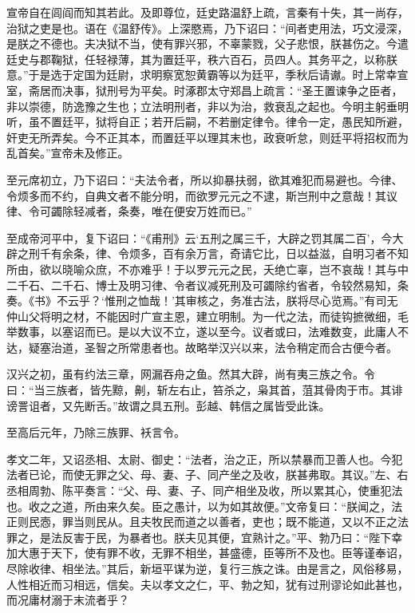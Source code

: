 \documentclass[12pt,UTF8]{ctexbook}
\begin{document}
宣帝自在闾阎而知其若此。及即尊位，廷史路温舒上疏，言秦有十失，其一尚存，治狱之吏是也。语在《温舒传》。上深愍焉，乃下诏曰：“间者吏用法，巧文浸深，是朕之不德也。夫决狱不当，使有罪兴邪，不辜蒙戮，父子悲恨，朕甚伤之。今遣廷史与郡鞠狱，任轻禄薄，其为置廷平，秩六百石，员四人。其务平之，以称朕意。”于是选于定国为廷尉，求明察宽恕黄霸等以为廷平，季秋后请谳。时上常幸宣室，斋居而决事，狱刑号为平矣。时涿郡太守郑昌上疏言：“圣王置谏争之臣者，非以崇德，防逸豫之生也；立法明刑者，非以为治，救衰乱之起也。今明主躬垂明听，虽不置廷平，狱将自正；若开后嗣，不若删定律令。律令一定，愚民知所避，奸吏无所弄矣。今不正其本，而置廷平以理其末也，政衰听怠，则廷平将招权而为乱首矣。”宣帝未及修正。



至元席初立，乃下诏曰：“夫法令者，所以抑暴扶弱，欲其难犯而易避也。今律、令烦多而不约，自典文者不能分明，而欲罗元元之不逮，斯岂刑中之意哉！其议律、令可蠲除轻减者，条奏，唯在便安万姓而已。”



至成帝河平中，复下诏曰：“《甫刑》云‘五刑之属三千，大辟之罚其属二百’，今大辟之刑千有余条，律、令烦多，百有余万言，奇请它比，日以益滋，自明习者不知所由，欲以晓喻众庶，不亦难乎！于以罗元元之民，夭绝亡辜，岂不哀哉！其与中二千石、二千石、博士及明习律、令者议减死刑及可蠲除约省者，令较然易知，条奏。《书》不云乎？‘惟刑之恤哉！’其审核之，务准古法，朕将尽心览焉。”有司无仲山父将明之材，不能因时广宣主恩，建立明制。为一代之法，而徒钩摭微细，毛举数事，以塞诏而已。是以大议不立，遂以至今。议者或曰，法难数变，此庸人不达，疑塞治道，圣智之所常患者也。故略举汉兴以来，法令稍定而合古便今者。



汉兴之初，虽有约法三章，网漏吞舟之鱼。然其大辟，尚有夷三族之令。令曰：“当三族者，皆先黥，劓，斩左右止，笞杀之，枭其首，菹其骨肉于市。其诽谤詈诅者，又先断舌。”故谓之具五刑。彭越、韩信之属皆受此诛。



至高后元年，乃除三族罪、袄言令。



孝文二年，又诏丞相、太尉、御史：“法者，治之正，所以禁暴而卫善人也。今犯法者已论，而使无罪之父、母、妻、子、同产坐之及收，朕甚弗取。其议。”左、右丞相周勃、陈平奏言：“父、母、妻、子、同产相坐及收，所以累其心，使重犯法也。收之之道，所由来久矣。臣之愚计，以为如其故便。”文帝复曰：“朕闻之，法正则民悫，罪当则民从。且夫牧民而道之以善者，吏也；既不能道，又以不正之法罪之，是法反害于民，为暴者也。朕夫见其便，宜熟计之。”平、勃乃曰：“陛下幸加大惠于天下，使有罪不收，无罪不相坐，甚盛德，臣等所不及也。臣等谨奉诏，尽除收律、相坐法。”其后，新垣平谋为逆，复行三族之诛。由是言之，风俗移易，人性相近而习相远，信矣。夫以孝文之仁，平、勃之知，犹有过刑谬论如此甚也，而况庸材溺于末流者乎？
\end{document}
